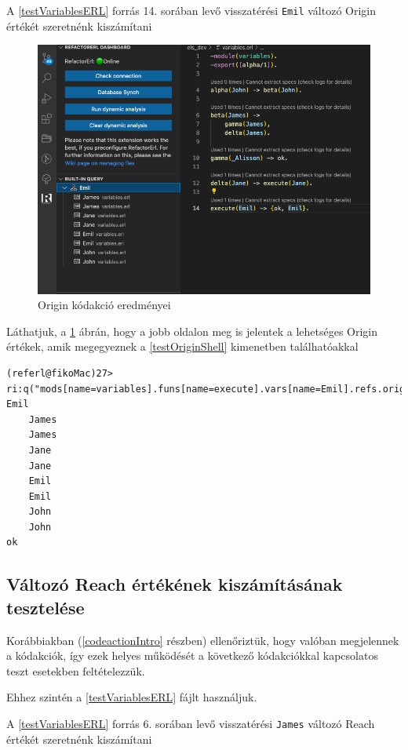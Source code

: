 A \ref{testVariablesERL} forrás 14. sorában levő visszatérési \lstinline{Emil} változó Origin értékét szeretnénk kiszámítani


\begin{figure}[H]
  \centering
  \includegraphics[width=0.9\linewidth]{images/testCases/testVarOr.png}
  \caption{Origin kódakció eredményei}
  \label{fig:testVarOr}
\end{figure}


Láthatjuk, a \ref{fig:testVarOr} ábrán, hogy a jobb oldalon meg is jelentek a lehetséges Origin értékek, amik megegyeznek a \ref{testOriginShell} kimenetben találhatóakkal


\lstset{caption=Válltozó Origin értéke Shellből, label=src:shell} \label{testOriginShell}
\begin{lstlisting}[language={shell}]  
(referl@fikoMac)27> ri:q("mods[name=variables].funs[name=execute].vars[name=Emil].refs.origin").    
Emil
    James
    James
    Jane
    Jane
    Emil
    Emil
    John
    John
ok
\end{lstlisting}


\subsection{Változó Reach értékének kiszámításának tesztelése}


Korábbiakban (\ref{codeactionIntro} részben) ellenőriztük, hogy valóban megjelennek a kódakciók, így ezek helyes működését a következő kódakciókkal kapcsolatos teszt esetekben feltételezzük.

\noindent Ehhez szintén a \ref{testVariablesERL} fájlt használjuk.
 

A \ref{testVariablesERL} forrás 6. sorában levő visszatérési \lstinline{James} változó Reach értékét szeretnénk kiszámítani


